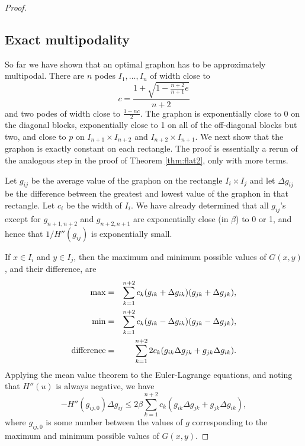 \documentclass[12pt]{amsart}
\newcommand\be{\begin{equation}}
\newcommand\ee{\end{equation}}
\begin{document}
{\begin{proof}
\subsection{Exact multipodality}

So far we have shown that an optimal graphon has to be approximately multipodal. There 
are $n$ podes $I_1, \ldots, I_n$ of width close to 
\be c = \frac{1 + \sqrt{1 - \frac{n+2}{n+1} e}}{n+2} \ee
and two podes of width close to $\frac{1-nc}{2}$. The graphon is exponentially close to 0 on the diagonal
blocks, exponentially close to 1 on all of the off-diagonal blocks but two, and close to $p$ on 
$I_{n+1}\times I_{n+2}$ and $I_{n+2}\times I_{n+1}$. We next show that the graphon is exactly constant
on each rectangle. The proof is essentially a rerun of the analogous step in the proof of Theorem
\ref{thm:flat2}, only with more terms. 

Let $g_{ij}$ be the average value of the graphon on the rectangle $I_i \times I_j$ and let 
$\Delta g_{ij}$ be the difference between the greatest and lowest value of the graphon in that rectangle. Let $c_i$ be 
the width of $I_i$. We have already determined that all $g_{ij}$'s except for $g_{n+1,n+2}$ and 
$g_{n+2,n+1}$ are exponentially close (in $\beta$) to 0 or 1, and hence that $1/H''(g_{ij})$ is 
exponentially small. 

If $x \in I_i$ and $y \in I_j$, then the maximum and minimum possible values of $G(x,y)$, and their
difference, are 
\begin{eqnarray}
\hbox{max} & = & \sum_{k=1}^{n+2} c_k (g_{ik}+\Delta g_{ik})(g_{jk} + \Delta g_{jk}), \cr 
\hbox{min} & = & \sum_{k=1}^{n+2} c_k (g_{ik}-\Delta g_{ik})(g_{jk} - \Delta g_{jk}), \cr 
\hbox{difference} & = & \sum_{k=1}^{n+2} 2c_k (g_{ik} \Delta g_{jk} + g_{jk} \Delta g_{ik}).
\end{eqnarray} 
Applying the mean value theorem to the Euler-Lagrange equations, 
and noting that $H''(u)$ is always negative, we have 
\be -H''(g_{ij,0}) \Delta g_{ij} \le 2 \beta \sum_{k=1}^{n+2} c_k (g_{ik} \Delta g_{jk} + g_{jk} \Delta g_{ik}), \ee
where $g_{ij,0}$ is some number between the values of $g$ corresponding to the maximum and minimum possible
values of $G(x,y)$. 


\end{proof}}
\end{document}
